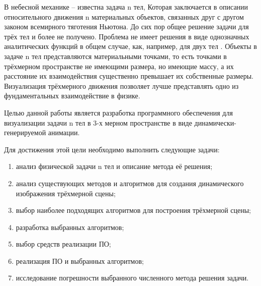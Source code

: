 
В небесной механике – известна задача n тел, Которая заключается в описании относительного движения n материальных объектов, связанных друг с другом законом всемирного тяготения Ньютона. До сих пор общее решение задачи для трёх тел и более не получено.
Проблема не имеет решения в виде однозначных аналитических функций в общем случае, как, например, для двух тел \cite{solution3}. Объекты в задаче n тел представляются материальными точками, то есть точками в трёхмерном пространстве не имеющими размера, но имеющие массу, а их расстояние их взаимодействия существенно превышает их собственные размеры. Визуализация трёхмерного движения позволяет лучше представлять одно из фундаментальных взаимодействие в физике.

Целью данной работы является разработка программного обеспечения для визуализации задачи n тел в 3-х мерном пространстве в виде динамически-генерируемой анимации.

Для достижения этой цели необходимо выполнить следующие задачи:

\begin{enumerate}
	\item анализ физической задачи n тел и описание метода её решения;
	\item анализ существующих методов и алгоритмов для создания динамического изображения трёхмерной сцены;
	\item выбор наиболее подходящих алгоритмов для построения трёхмерной сцены;
	\item разработка выбранных алгоритмов;
	\item выбор средств реализации ПО;
	\item реализация ПО и выбранных алгоритмов;
	\item исследование погрешности выбранного численного метода решения задачи.
\end{enumerate}

\clearpage
